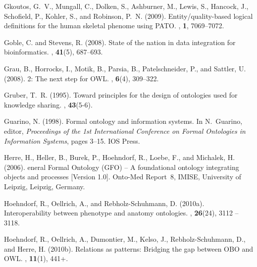 \documentclass{bioinfo}
\begin{document}
\begin{thebibliography}{}
Gkoutos, G.~V., Mungall, C., Dolken, S., Ashburner, M., Lewis, S., Hancock, J.,
  Schofield, P., Kohler, S., and Robinson, P.~N. (2009).
\newblock Entity/quality-based logical definitions for the human skeletal
  phenome using {PATO}.
, {\bf 1}, 7069--7072.

Goble, C. and Stevens, R. (2008).
\newblock State of the nation in data integration for bioinformatics.
, {\bf 41}(5), 687--693.

Grau, B., Horrocks, I., Motik, B., Parsia, B., Patelschneider, P., and Sattler,
  U. (2008).
 2: The next step for {OWL}.
, {\bf 6}(4), 309--322.

Gruber, T.~R. (1995).
\newblock Toward principles for the design of ontologies used for knowledge
  sharing.
, {\bf
  43}(5-6).

Guarino, N. (1998).
\newblock Formal ontology and information systems.
\newblock In N.~Guarino, editor, {\em Proceedings of the 1st International
  Conference on Formal Ontologies in Information Systems\/}, pages 3--15. IOS
  Press.

Herre, H., Heller, B., Burek, P., Hoehndorf, R., Loebe, F., and Michalek, H.
  (2006).
eneral {F}ormal {O}ntology ({GFO}) -- {A} foundational ontology
  integrating objects and processes [{V}ersion 1.0].
\newblock Onto-Med Report~8, IMISE, University of Leipzig, Leipzig, Germany.

Hoehndorf, R., Oellrich, A., and Rebholz-Schuhmann, D. (2010a).
\newblock Interoperability between phenotype and anatomy ontologies.
, {\bf 26}(24), 3112 -- 3118.

Hoehndorf, R., Oellrich, A., Dumontier, M., Kelso, J., Rebholz-Schuhmann, D.,
  and Herre, H. (2010b).
\newblock Relations as patterns: Bridging the gap between {OBO} and {OWL}.
, {\bf 11}(1), 441+.


\end{thebibliography}
\end{document}
